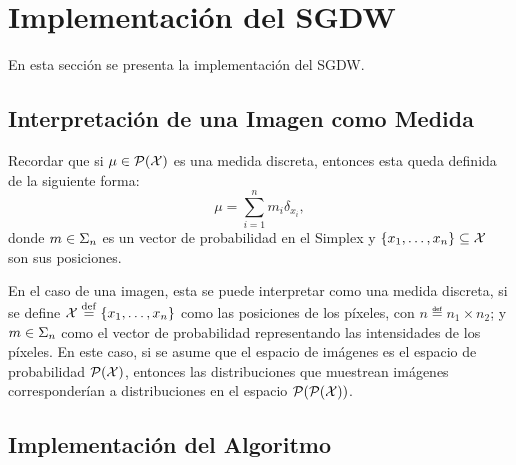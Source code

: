 \section{Implementación del SGDW}\label{sec:sgdw}  %


En esta sección se presenta la implementación del SGDW.

\subsection{Interpretación de una Imagen como Medida}\label{ssec:interpr-imagen-medida}  %

Recordar que si $\mu\in \ProbSpace[\cX] $ es una medida discreta, entonces esta queda definida de la siguiente forma:
\begin{equation}\label{eq:medida-discreta}
    \mu = \sum_{i=1}^{n} m_i \delta_{x_i},
\end{equation}
donde $m \in \Simplex[n]$ es un vector de probabilidad en el Simplex y $ \left\{ x_1, \dots, x_n \right\} \subseteq \cX $ son sus posiciones.

En el caso de una imagen, esta se puede interpretar como una medida discreta, si se define $\cX \eqdef \left\{ x_1, \dots, x_n \right\}$ como las posiciones de los píxeles, con $n \eqdef n_1 \times n_2$; y $m \in \Simplex[n]$ como el vector de probabilidad representando las intensidades de los píxeles. En este caso, si se asume que el espacio de imágenes es el espacio de probabilidad $\ProbSpace[\cX] $, entonces las distribuciones que muestrean imágenes corresponderían a distribuciones en el espacio $\ProbSpace[\ProbSpace[\cX] ] $.



\subsection{Implementación del Algoritmo}\label{ssec:implementacion-algoritmo}  %

